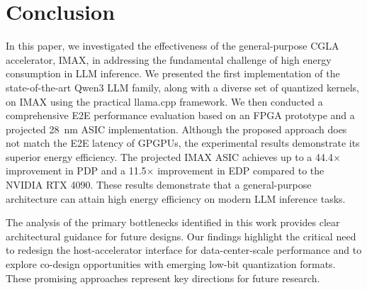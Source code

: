 \section{Conclusion}
\label{conclusions}

In this paper, we investigated the effectiveness of the general-purpose CGLA accelerator, IMAX, in addressing the fundamental challenge of high energy consumption in LLM inference. 
We presented the first implementation of the state-of-the-art Qwen3 LLM family, along with a diverse set of quantized kernels, on IMAX using the practical llama.cpp framework. 
We then conducted a comprehensive E2E performance evaluation based on an FPGA prototype and a projected \SI{28}{\nano\meter} ASIC implementation.  
Although the proposed approach does not match the E2E latency of GPGPUs, the experimental results demonstrate its superior energy efficiency. 
The projected IMAX ASIC achieves up to a \num{44.4}$\times$ improvement in PDP and a \num{11.5}$\times$ improvement in EDP compared to the NVIDIA RTX 4090.
These results demonstrate that a general-purpose architecture can attain high energy efficiency on modern LLM inference tasks.

The analysis of the primary bottlenecks identified in this work provides clear architectural guidance for future designs. 
Our findings highlight the critical need to redesign the host-accelerator interface for data-center-scale performance and to explore co-design opportunities with emerging low-bit quantization formats. 
These promising approaches represent key directions for future research.